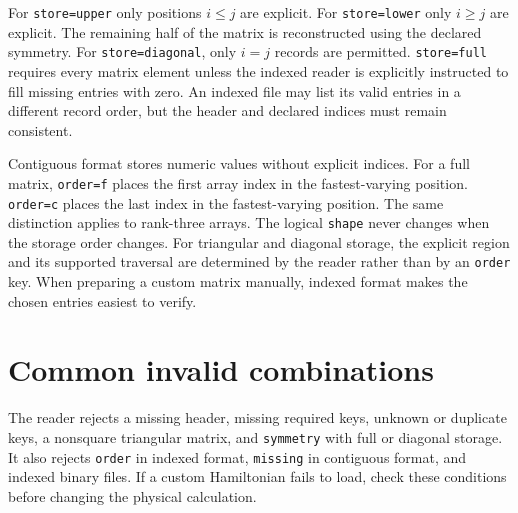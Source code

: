 For \texttt{store=upper} only positions \(i\leq j\) are explicit. For \texttt{store=lower} only \(i\geq j\) are explicit. The remaining half of the matrix is reconstructed using the declared symmetry. For \texttt{store=diagonal}, only \(i=j\) records are permitted. \texttt{store=full} requires every matrix element unless the indexed reader is explicitly instructed to fill missing entries with zero. An indexed file may list its valid entries in a different record order, but the header and declared indices must remain consistent.

Contiguous format stores numeric values without explicit indices. For a full matrix, \texttt{order=f} places the first array index in the fastest-varying position. \texttt{order=c} places the last index in the fastest-varying position. The same distinction applies to rank-three arrays. The logical \texttt{shape} never changes when the storage order changes. For triangular and diagonal storage, the explicit region and its supported traversal are determined by the reader rather than by an \texttt{order} key. When preparing a custom matrix manually, indexed format makes the chosen entries easiest to verify.

\section{Common invalid combinations}
The reader rejects a missing header, missing required keys, unknown or duplicate keys, a nonsquare triangular matrix, and \texttt{symmetry} with full or diagonal storage. It also rejects \texttt{order} in indexed format, \texttt{missing} in contiguous format, and indexed binary files. If a custom Hamiltonian fails to load, check these conditions before changing the physical calculation.
